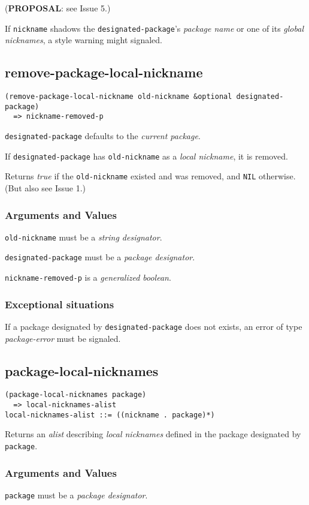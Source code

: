 \documentclass[11pt]{article}
\begin{document}
(\textbf{PROPOSAL}: see Issue 5.)

If \texttt{nickname} shadows the \texttt{designated-package}'s \emph{package name} or one of its
\emph{global nicknames}, a style warning might signaled.
\subsection{remove-package-local-nickname}
\label{sec:org4088e22}
\begin{verbatim}
(remove-package-local-nickname old-nickname &optional designated-package)
  => nickname-removed-p
\end{verbatim}

\texttt{designated-package} defaults to the \emph{current package}.

If \texttt{designated-package} has \texttt{old-nickname} as a \emph{local nickname}, it is removed.

Returns \emph{true} if the \texttt{old-nickname} existed and was removed, and \texttt{NIL}
otherwise. (But also see Issue 1.)
\subsubsection{Arguments and Values}
\label{sec:org1a1d504}
\texttt{old-nickname} must be a \emph{string designator}.

\texttt{designated-package} must be a \emph{package designator}.

\texttt{nickname-removed-p} is a \emph{generalized boolean}.
\subsubsection{Exceptional situations}
\label{sec:org177e964}
If a package designated by \texttt{designated-package} does not exists, an error of type
\emph{package-error} must be signaled.
\subsection{package-local-nicknames}
\label{sec:org60667be}
\begin{verbatim}
(package-local-nicknames package)
  => local-nicknames-alist
local-nicknames-alist ::= ((nickname . package)*)
\end{verbatim}

Returns an \emph{alist} describing \emph{local nicknames} defined in the package designated
by \texttt{package}.
\subsubsection{Arguments and Values}
\label{sec:org8f53763}
\texttt{package} must be a \emph{package designator}.
\end{document}
